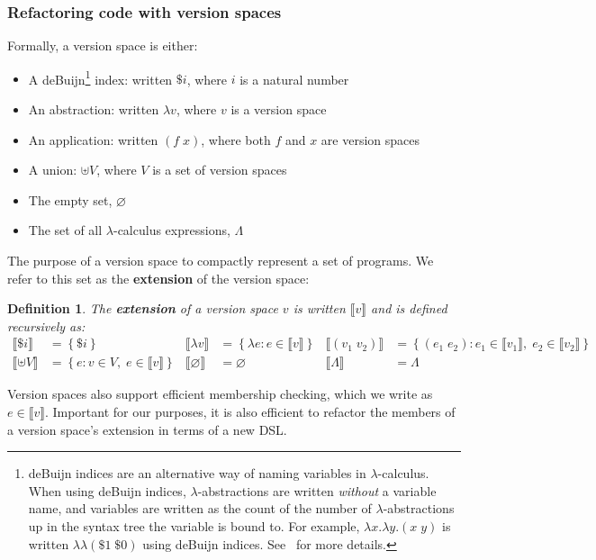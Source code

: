 \documentclass{article}
\newcommand{\denotation}[1]{{\llbracket #1 \rrbracket}}
\newtheorem{definition}{Definition}
\begin{document}
 \subsubsection{Refactoring code with version spaces}\label{appendixVersion}
 Formally, a version space is either:
\begin{itemize}
\item A deBuijn\footnote{deBuijn indices are an alternative way of naming variables in $\lambda$-calculus. When using deBuijn indices, $\lambda$-abstractions are written \emph{without} a variable name, and variables are written as the count of the number of $\lambda$-abstractions up in the syntax tree the variable is bound to. For example, $\lambda x.\lambda y. (x\;y)$ is written $\lambda\lambda (\$1\;\$0)$ using deBuijn indices. See~\cite{pierce} for more details.} index: written $\$i$, where $i$ is a natural number
\item An abstraction: written $\lambda v$, where $v$ is a version space
\item An  application: written $(f \;x)$, where both  $f$ and $x$ are version spaces
\item A  union: $\uplus V$, where $V$ is a set of version spaces
\item The empty set, $\varnothing$
\item The set of all $\lambda$-calculus expressions, $\Lambda$
\end{itemize}
The purpose of a version space to compactly represent a set of programs.
We refer to this set as the \textbf{extension} of the version space:
\begin{definition}
  The \textbf{extension} of a version space $v$ is written $\denotation{v}$
  and is defined recursively as:
  \begin{align*}
    \denotation{\$i}& = \left\{\$i \right\}&
    \denotation{\lambda v}& = \left\{\lambda e : e\in \denotation{v} \right\}&
    \denotation{(v_1\; v_2)}& = \left\{(e_1\;e_2) : e_1\in \denotation{v_1},\;e_2\in \denotation{v_2} \right\}\\
    \denotation{\uplus V}& = \left\{e : v\in V,\;e\in \denotation{v} \right\}&
    \denotation{\varnothing}& = \varnothing&
    \denotation{\Lambda}& = \Lambda
    \end{align*}
\end{definition}
Version spaces also support efficient membership checking, which we
write as  $e\in \denotation{v}$.
Important for our purposes, it is also efficient to refactor the
members of a version space's extension in terms of a new DSL.
\end{document}
